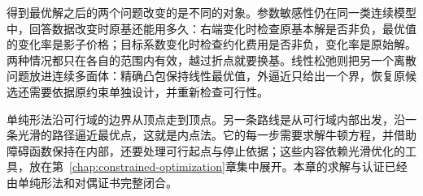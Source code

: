 得到最优解之后的两个问题改变的是不同的对象。参数敏感性仍在同一类连续模型中，回答数据改变时原基还能用多久：右端变化时检查原基本解是否非负，最优值的变化率是影子价格；目标系数变化时检查约化费用是否非负，变化率是原始解。两种情况都只在各自的范围内有效，越过折点就要换基。线性松弛则把另一个离散问题放进连续多面体：精确凸包保持线性最优值，外逼近只给出一个界，恢复原候选还需要依据原约束单独设计，并重新检查可行性。

单纯形法沿可行域的边界从顶点走到顶点。另一条路线是从可行域内部出发，沿一条光滑的路径逼近最优点，这就是内点法。它的每一步需要求解牛顿方程，并借助障碍函数保持在内部，还要处理可行起点与停止依据；这些内容依赖光滑优化的工具，放在第~\ref{chap:constrained-optimization}章集中展开。本章的求解与认证已经由单纯形法和对偶证书完整闭合。
